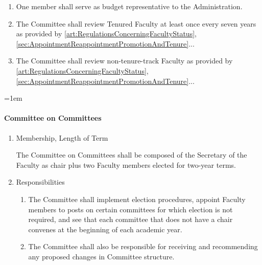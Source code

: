 \documentclass{manual}
\let\oldparagraph\paragraph
\renewcommand\paragraph{\leftskip=1em\oldparagraph}
\newcommand{\itemLevelA}{\alph*.}
\newcommand{\itemLevelB}{\arabic*)}
\newcommand{\itemRefA}{\alph*}
\newcommand{\itemRefB}{\arabic*}
\begin{document}
\begin{enumerate}[label=\itemLevelA,ref=\itemRefA]
\begin{enumerate}[label=\itemLevelB,ref=\itemRefB]
\item One member shall serve as budget representative to the Administration.

\item The Committee shall review Tenured Faculty at least once every seven years as provided by \cref{art:RegulationsConcerningFacultyStatus}, \cref{sec:AppointmentReappointmentPromotionAndTenure}...

\item The Committee shall review non-tenure-track Faculty as provided by \cref{art:RegulationsConcerningFacultyStatus}, \cref{sec:AppointmentReappointmentPromotionAndTenure}...

\end{enumerate}
\end{enumerate}


\paragraph{Committee on Committees}

\begin{enumerate}[label=\itemLevelA,ref=\itemRefA]

\item Membership, Length of Term

The Committee on Committees shall be composed of the Secretary of the Faculty as chair plus two Faculty members elected for two-year terms.

\item Responsibilities
\begin{enumerate}[label=\itemLevelB,ref=\itemRefB]

\item The Committee shall implement election procedures, appoint Faculty members to posts on certain committees for which election is not required, and see that each committee that does not have a chair convenes at the beginning of each academic year.

\item The Committee shall also be responsible for receiving and recommending any proposed changes in Committee structure.

\end{enumerate}
\end{enumerate}
\end{document}
